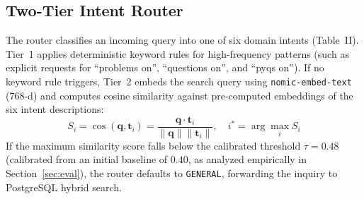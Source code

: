 \documentclass[conference]{IEEEtran}
\begin{document}
\subsection{Two-Tier Intent Router}
The router classifies an incoming query into one of six domain intents (Table~II). Tier~1 applies deterministic keyword rules for high-frequency patterns (such as explicit requests for ``problems on'', ``questions on'', and ``pyqs on''). If no keyword rule triggers, Tier~2 embeds the search query using \texttt{nomic-embed-text} (768-d) and computes cosine similarity against pre-computed embeddings of the six intent descriptions:
\begin{equation}
S_i = \cos(\mathbf{q}, \mathbf{t}_i) = \frac{\mathbf{q} \cdot \mathbf{t}_i}{\|\mathbf{q}\| \|\mathbf{t}_i\|}, \quad i^* = \arg\max_i S_i
\end{equation}
If the maximum similarity score falls below the calibrated threshold $\tau=0.48$ (calibrated from an initial baseline of $0.40$, as analyzed empirically in Section~\ref{sec:eval}), the router defaults to \texttt{GENERAL}, forwarding the inquiry to PostgreSQL hybrid search.


\begin{table}[t]
\caption{Six-Class Intent Taxonomy and Routing Targets}
\label{tab:intents}
\centering
{}
\end{table}
\end{document}
